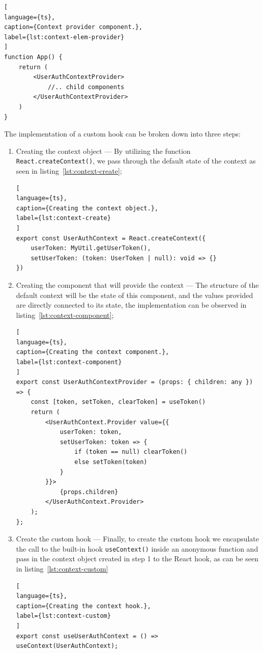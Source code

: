 \begin{lstlisting}[
language={ts},
caption={Context provider component.},
label={lst:context-elem-provider}
]
function App() {
    return (
        <UserAuthContextProvider>
            //.. child components
        </UserAuthContextProvider>
    )
}
\end{lstlisting}

The implementation of a custom hook can be broken down into three steps:

\begin{enumerate}
    \item Creating the context object --- By utilizing the function \lstinline{React.createContext()}, we pass through the default state of the context as seen in listing~\ref{lst:context-create};

\begin{lstlisting}[
language={ts},
caption={Creating the context object.},
label={lst:context-create}
]
export const UserAuthContext = React.createContext({
    userToken: MyUtil.getUserToken(),
    setUserToken: (token: UserToken | null): void => {}
})
\end{lstlisting}
    \item Creating the component that will provide the context --- The structure of the default context will be the state of this component, and the values provided are directly connected to its state, the implementation can be observed in listing~\ref{lst:context-component};
\begin{lstlisting}[
language={ts},
caption={Creating the context component.},
label={lst:context-component}
]
export const UserAuthContextProvider = (props: { children: any }) => {
    const [token, setToken, clearToken] = useToken()
    return (
        <UserAuthContext.Provider value={{
            userToken: token,
            setUserToken: token => {
                if (token == null) clearToken()
                else setToken(token)
            }
        }}>
            {props.children}
        </UserAuthContext.Provider>
    );
};
\end{lstlisting}
    \item Create the custom hook --- Finally, to create the custom hook we encapsulate the call to the built-in hook \lstinline{useContext()} inside an anonymous function and pass in the context object created in step 1 to the React hook, as can be seen in listing~\ref{lst:context-custom}
\begin{lstlisting}[
language={ts},
caption={Creating the context hook.},
label={lst:context-custom}
]
export const useUserAuthContext = () => useContext(UserAuthContext);
\end{lstlisting}
\end{enumerate}


